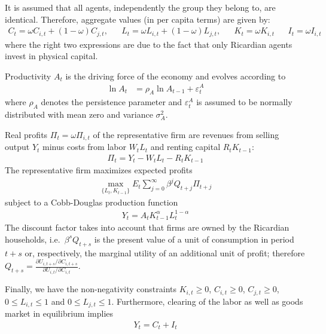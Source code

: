 \documentclass{article}
\begin{document}
It is assumed that all agents, independently the group they belong to, are identical.
Therefore, aggregate values (in per capita terms) are given by:
\begin{align*}
C_t = \omega C_{i,t} + (1-\omega)C_{j,t},
&& L_t = \omega L_{i,t} + (1-\omega)L_{j,t},
&& K_t = \omega K_{i,t}
&& I_t = \omega I_{i,t}
\end{align*}
where the right two expressions are due to the fact that only Ricardian agents invest in physical capital.

Productivity \(A_t\) is the driving force of the economy and evolves according to
\begin{align*}
\ln{A_{t}} &= \rho_A \ln{A_{t-1}}  + \varepsilon_t^A
\end{align*}
where \(\rho_A\) denotes the persistence parameter and \(\varepsilon_t^A\) is assumed to be normally distributed with mean zero and variance \(\sigma_A^2\).

Real profits \(\Pi_t = \omega \Pi_{i,t}\) of the representative firm are revenues from selling output \(Y_t\) minus costs from labor \(W_t L_t\) and renting capital \(R_t K_{t-1}\):
\begin{align*}
\Pi_t = Y_{t} - W_{t} L_{t} - R_{t} K_{t-1}
\end{align*}
The representative firm maximizes expected profits
\begin{align*}
\underset{\{L_{t},K_{t-1}\}}{\max} E_t \sum_{j=0}^{\infty} \beta^j Q_{t+j}\Pi_{t+j}
\end{align*}
subject to a Cobb-Douglas production function
\begin{align*}
Y_t = A_t K_{t-1}^\alpha L_t^{1-\alpha}
\end{align*}
The discount factor takes into account that firms are owned by the Ricardian households,
  i.e.\ \(\beta^s Q_{t+s}\) is the present value of a unit of consumption in period \(t+s\)
  or, respectively, the marginal utility of an additional unit of profit;
  therefore \(Q_{t+s}=\frac{\partial U_{i,t+s}/\partial C_{i,t+s}}{\partial U_{i,t}/\partial C_{i,t}}\).

Finally, we have the non-negativity constraints
  \(K_{i,t} \geq0\), \(C_{i,t} \geq 0\), \(C_{j,t} \geq 0\), \(0\leq L_{i,t} \leq 1\) and \(0\leq L_{j,t} \leq 1\).
Furthermore, clearing of the labor as well as goods market in equilibrium implies
\begin{align*}
Y_t = C_t + I_t
\end{align*}
\end{document}
